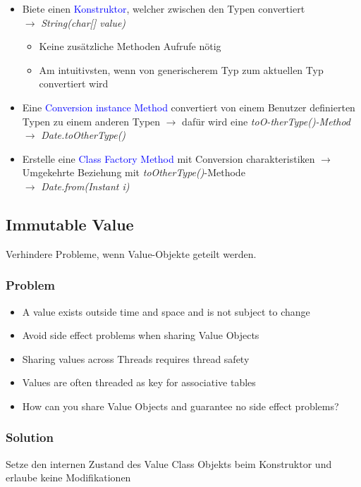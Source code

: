\begin{itemize}
    \item Biete einen \textcolor{blue}{Konstruktor}, welcher zwischen den Typen convertiert \\
    $\rightarrow$ \textit{String(char[] value)}
    \begin{itemize}
        \item Keine zusätzliche Methoden Aufrufe nötig
        \item Am intuitivsten, wenn von generischerem Typ zum aktuellen Typ convertiert wird
    \end{itemize}
    \item Eine \textcolor{blue}{Conversion instance Method} convertiert von einem Benutzer definierten Typen zu einem anderen Typen $\rightarrow$ dafür wird eine \textit{toO-therType()-Method} \\
    $\rightarrow$ \textit{Date.toOtherType()}
    \item Erstelle eine \textcolor{blue}{Class Factory Method} mit Conversion charakteristiken $\rightarrow$ Umgekehrte Beziehung mit \textit{toOtherType()}-Methode \\
    $\rightarrow$ \textit{Date.from(Instant i)}
\end{itemize}

\vfill\null
\columnbreak

\subsection{Immutable Value}

Verhindere Probleme, wenn Value-Objekte geteilt werden.

\subsubsection{Problem}
\begin{itemize}
    \item A value exists outside time and space and is not subject to change
    \item Avoid side effect problems when sharing Value Objects
    \item Sharing values across Threads requires thread safety
    \item Values are often threaded as key for associative tables
    \item How can you share Value Objects and guarantee no side effect problems?
\end{itemize}
\subsubsection{Solution}
Setze den internen Zustand des Value Class Objekts beim Konstruktor und erlaube keine Modifikationen

